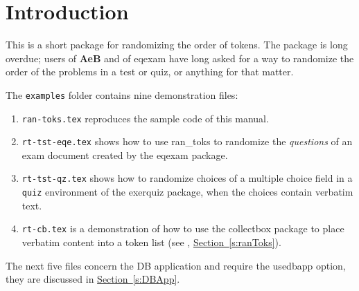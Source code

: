 \documentclass{article}
\let\pkg\textsf
\let\env\texttt
\let\opt\textsf
\def\exSrc{\makebox[0pt][r]{\large{\Pisymbol{webd}{157}}\enspace}}
\begin{document}
\maketitle

\tableofcontents
{}

\section{Introduction}

This is a short package for randomizing the order of tokens. The package
is long overdue; users of \textsf{\textbf{AeB}} and of \pkg{eqexam} have long asked for a way to
randomize the order of the problems in a test or quiz, or anything for
that matter.

\newtopic\noindent\exSrc The \texttt{examples} folder contains nine demonstration files:
\begin{enumerate}
    \item \texttt{ran-toks.tex} reproduces the sample code of this manual.
    \item \texttt{rt-tst-eqe.tex} shows how to use \pkg{ran\_toks} to
        randomize the \emph{questions} of an exam document created by the
        \pkg{eqexam} package.
    \item \texttt{rt-tst-qz.tex} shows how to randomize choices of a
        multiple choice field in a \env{quiz} environment of the
        \pkg{exerquiz} package, when the choices contain verbatim text.
    \item \texttt{rt-cb.tex} is a demonstration of how to use the
        \pkg{collectbox} package to place verbatim content into a token list
        (see , \hyperref[s:ranToks]{Section~\ref*{s:ranToks}}).
\xdef\svEnumi{\the\value{enumi}}
\end{enumerate}
The next five files concern the DB application and require the \opt{usedbapp} option,
they are discussed in \hyperref[s:DBApp]{Section~\ref*{s:DBApp}}.
\end{document}
